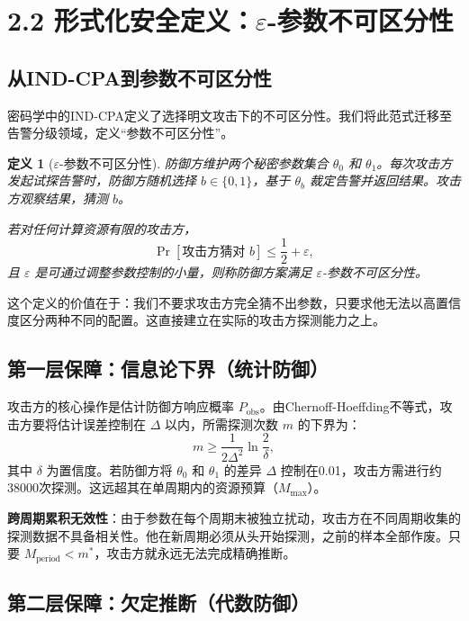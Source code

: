 \documentclass[11pt,a4paper]{article}
\newtheorem{definition}{定义}[section]
\begin{document}
\section{2.2 形式化安全定义：$\varepsilon$-参数不可区分性}

\subsection{从IND-CPA到参数不可区分性}

密码学中的IND-CPA定义了选择明文攻击下的不可区分性。我们将此范式迁移至告警分级领域，定义“参数不可区分性”。

\begin{definition}[\(\varepsilon\)-参数不可区分性]
防御方维护两个秘密参数集合 \(\theta_0\) 和 \(\theta_1\)。每次攻击方发起试探告警时，防御方随机选择 \(b \in \{0,1\}\)，基于 \(\theta_b\) 裁定告警并返回结果。攻击方观察结果，猜测 \(b\)。

若对任何计算资源有限的攻击方，
\[
\Pr[\text{攻击方猜对 } b] \le \frac{1}{2} + \varepsilon,
\]
且 \(\varepsilon\) 是可通过调整参数控制的小量，则称防御方案满足 \(\varepsilon\)-参数不可区分性。
\end{definition}

这个定义的价值在于：我们不要求攻击方完全猜不出参数，只要求他无法以高置信度区分两种不同的配置。这直接建立在实际的攻击方探测能力之上。

\subsection{第一层保障：信息论下界（统计防御）}

攻击方的核心操作是估计防御方响应概率 \(P_{\text{obs}}\)。由Chernoff-Hoeffding不等式，攻击方要将估计误差控制在 \(\Delta\) 以内，所需探测次数 \(m\) 的下界为：
\[
m \ge \frac{1}{2\Delta^2} \ln\frac{2}{\delta},
\]
其中 \(\delta\) 为置信度。若防御方将 \(\theta_0\) 和 \(\theta_1\) 的差异 \(\Delta\) 控制在0.01，攻击方需进行约38000次探测。这远超其在单周期内的资源预算（\(M_{\max}\)）。

\textbf{跨周期累积无效性}：由于参数在每个周期末被独立扰动，攻击方在不同周期收集的探测数据不具备相关性。他在新周期必须从头开始探测，之前的样本全部作废。只要 \(M_{\text{period}} < m^*\)，攻击方就永远无法完成精确推断。

\subsection{第二层保障：欠定推断（代数防御）}
\end{document}

